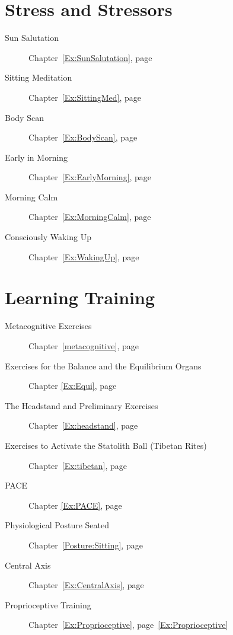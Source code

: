 \documentclass[../main.tex]{subfiles}
\begin{document}
%
\section{Stress and Stressors}

\begin{description}
\item[Sun Salutation] Chapter~\ref{Ex:SunSalutation}, page~\pageref{Ex:SunSalutation}
\item[Sitting Meditation] Chapter~\ref{Ex:SittingMed}, page~\pageref{Ex:SittingMed}
\item[Body Scan] Chapter~\ref{Ex:BodyScan}, page~\pageref{Ex:BodyScan}
  \item[Early in Morning] Chapter~\ref{Ex:EarlyMorning}, page~\pageref{Ex:EarlyMorning}
  \item[Morning Calm] Chapter~\ref{Ex:MorningCalm}, page~\pageref{Ex:MorningCalm}
    \item[Consciously Waking Up] Chapter~\ref{Ex:WakingUp}, page~\pageref{Ex:WakingUp}
  \end{description}

\section{Learning Training}
\begin{description} 
\item[Metacognitive Exercises] Chapter~\ref{metacognitive}, page~\pageref{metacognitive}
\item[Exercises for the Balance and the Equilibrium Organs] Chapter \ref{Ex:Equi}, page~\pageref{Ex:Equi}
\item[The Headstand and Preliminary Exercises] Chapter~\ref{Ex:headstand}, page~\pageref{Ex:headstand}
\item[Exercises to Activate the Statolith Ball (Tibetan Rites)] Chapter~\ref{Ex:tibetan}, page~\pageref{Ex:tibetan}
\item[PACE] Chapter \ref{Ex:PACE}, page \pageref{Ex:PACE}
\item[Physiological Posture Seated] Chapter~\ref{Posture:Sitting}, page~\pageref{Posture:Sitting}
\item[Central Axis] Chapter~\ref{Ex:CentralAxis}, page~\pageref{Ex:CentralAxis}
\item[Proprioceptive Training] Chapter~\ref{Ex:Proprioceptive}, page~\ref{Ex:Proprioceptive}
\end{description}
\end{document}
